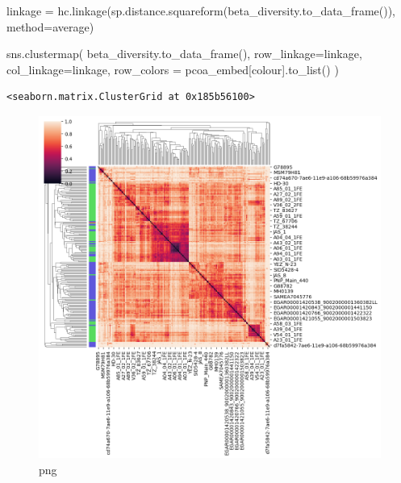 \documentclass[
  letterpaper,
]{book}
\newenvironment{Shaded}{}{}
\newcommand{\NormalTok}[1]{\textcolor[rgb]{0.14,0.16,0.18}{#1}}
\newcommand{\OperatorTok}[1]{\textcolor[rgb]{0.14,0.16,0.18}{#1}}
\newcommand{\StringTok}[1]{\textcolor[rgb]{0.01,0.18,0.38}{#1}}
\begin{document}
\begin{Shaded}
\begin{Highlighting}[]
\NormalTok{linkage }\OperatorTok{=}\NormalTok{ hc.linkage(sp.distance.squareform(beta\_diversity.to\_data\_frame()), method}\OperatorTok{=}\StringTok{\textquotesingle{}average\textquotesingle{}}\NormalTok{)}

\NormalTok{sns.clustermap(}
\NormalTok{    beta\_diversity.to\_data\_frame(),}
\NormalTok{    row\_linkage}\OperatorTok{=}\NormalTok{linkage,}
\NormalTok{    col\_linkage}\OperatorTok{=}\NormalTok{linkage,}
\NormalTok{    row\_colors }\OperatorTok{=}\NormalTok{ pcoa\_embed[}\StringTok{\textquotesingle{}colour\textquotesingle{}}\NormalTok{].to\_list()}
\NormalTok{)}
\end{Highlighting}
\end{Shaded}

\begin{verbatim}
<seaborn.matrix.ClusterGrid at 0x185b56100>
\end{verbatim}

\begin{figure}

{\centering \includegraphics{assets/images/chapters/taxonomic-profiling/analysis_115_1.png}

}

\caption{png}

\end{figure}
\end{document}

